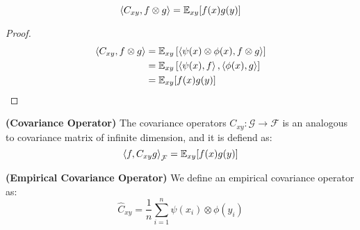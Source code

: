 \begin{corollary}
    \begin{equation*}
        \left\langle C_{xy}, f\otimes g \right\rangle = \mathbb{E}_{xy}[f(x)g(y)]
    \end{equation*}
\end{corollary}
\begin{proof}
    \begin{equation*}
    \begin{aligned}
        \left\langle C_{xy}, f\otimes g \right\rangle &= \mathbb{E}_{xy}\left[ \left\langle \psi(x)\otimes\phi(x), f\otimes g \right\rangle \right] \\
        &= \mathbb{E}_{xy}\left[ \left\langle \psi(x), f \right\rangle, \left\langle \phi(x), g \right\rangle \right] \\
        &= \mathbb{E}_{xy}[f(x)g(y)]
    \end{aligned}
    \end{equation*}
\end{proof}

\begin{definition}{\textbf{(Covariance Operator)}}
    The covariance operators $C_{xy} : \mathcal{G} \rightarrow \mathcal{F}$ is an analogous to covariance matrix of infinite dimension, and it is defiend as:
    \begin{equation*}
        \left\langle f, C_{xy}g \right\rangle_\mathcal{F} = \mathbb{E}_{xy}[f(x)g(y)]
    \end{equation*}
\end{definition}

\begin{definition}{\textbf{(Empirical Covariance Operator)}}
    We define an empirical covariance operator as:
    \begin{equation*}
        \hat{C}_{xy} = \frac{1}{n}\sum^n_{i=1}\psi(x_i)\otimes\phi(y_i)
    \end{equation*}
\end{definition}

